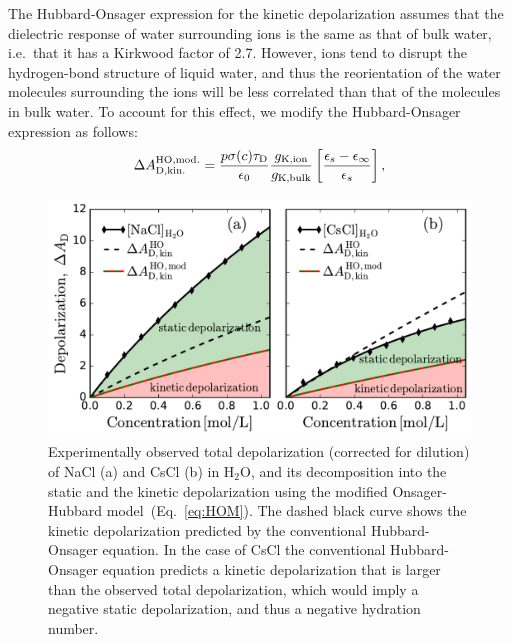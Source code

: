 The Hubbard-Onsager expression for the kinetic depolarization assumes that the dielectric response of water surrounding ions is the same as that of bulk water, i.e.\ that it has a Kirkwood factor of 2.7. However, ions tend to disrupt the hydrogen-bond structure of liquid water, and thus the reorientation of the water molecules surrounding the ions will be less correlated than that of the molecules in bulk water. To account for this effect, we modify the Hubbard-Onsager expression as follows:
\begin{equation}
\Delta A_{\text{D,kin.}}^{\rm HO,mod.} = \frac{p \sigma(c) \tau_{\rm D} }{ \epsilon_0 }\frac{g_\text{K,ion}}{g_\text{K,bulk}} \left[ \frac{\epsilon_s -\epsilon_{\infty}}{\epsilon_s } \right],
\label{eq:HOM}
\end{equation}
\begin{figure}[t!]
	\centering
	\includegraphics[width=0.85\figwidth]{chapters/Chapter4_PRL/Graphs/DepolarizationSeparation2.pdf}
	\caption{Experimentally observed total depolarization (corrected for dilution) of NaCl (a) and CsCl (b) in H$_2$O, and its decomposition into the static and the kinetic depolarization using the modified Onsager-Hubbard model~(Eq.\ \ref{eq:HOM}). The dashed black curve shows the kinetic depolarization predicted by the conventional Hubbard-Onsager equation. In the case of CsCl the conventional Hubbard-Onsager equation predicts a kinetic depolarization that is larger than the observed total depolarization, which would imply a negative static depolarization, and thus a negative hydration number.}
	\label{fig:HOM}
\end{figure}
